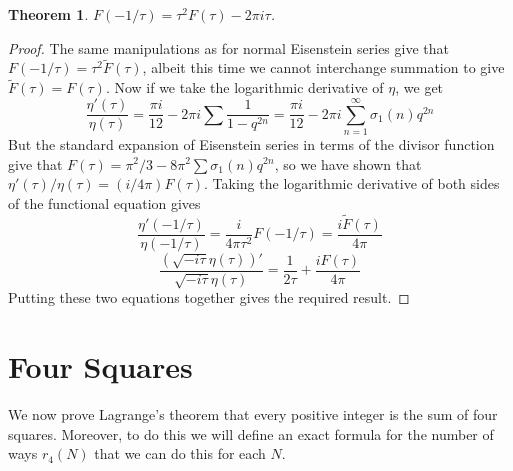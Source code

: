 \documentclass{article}
\theoremstyle{plain}
\newtheorem{theorem}{Theorem}
\theoremstyle{remark}
\theoremstyle{definition}
\begin{document}
\begin{theorem}
    $F(-1/\tau) = \tau^2 F(\tau) - 2\pi i \tau$.
\end{theorem}
\begin{proof}
    The same manipulations as for normal Eisenstein series give that $F(-1/\tau) = \tau^2 \tilde{F}(\tau)$, albeit this time we cannot interchange summation to give $\tilde{F}(\tau) = F(\tau)$. Now if we take the logarithmic derivative of $\eta$, we get
    \[ \frac{\eta'(\tau)}{\eta(\tau)} = \frac{\pi i}{12} - 2 \pi i \sum \frac{1}{1 - q^{2n}} = \frac{\pi i}{12} - 2 \pi i \sum_{n = 1}^\infty \sigma_1(n) q^{2n} \]
    But the standard expansion of Eisenstein series in terms of the divisor function give that $F(\tau) = \pi^2/3 - 8 \pi^2 \sum \sigma_1(n) q^{2n}$, so we have shown that $\eta'(\tau)/\eta(\tau) = (i/4\pi) F(\tau)$. Taking the logarithmic derivative of both sides of the functional equation gives
    \[ \frac{\eta'(-1/\tau)}{\eta(-1/\tau)} = \frac{i}{4 \pi \tau^2} F(-1/\tau) = \frac{i \tilde{F}(\tau)}{4\pi} \]
    \[ \frac{(\sqrt{-i\tau} \eta(\tau))'}{\sqrt{-i \tau} \eta(\tau)} = \frac{1}{2 \tau} + \frac{i F(\tau)}{4 \pi} \]
    Putting these two equations together gives the required result.
\end{proof}

\section{Four Squares}

We now prove Lagrange's theorem that every positive integer is the sum of four squares. Moreover, to do this we will define an exact formula for the number of ways $r_4(N)$ that we can do this for each $N$.
\end{document}
